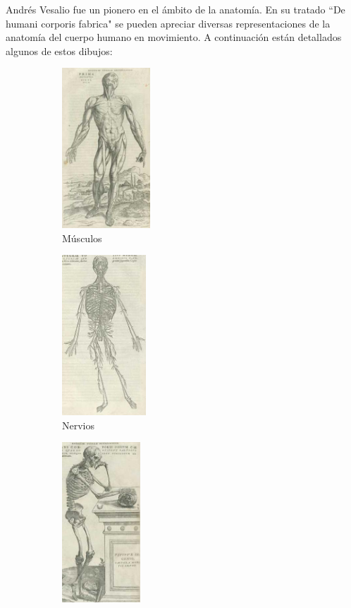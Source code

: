 Andrés Vesalio fue un pionero en el ámbito de la anatomía. En su tratado ``De humani corporis fabrica" se pueden apreciar diversas representaciones de la anatomía del cuerpo humano en movimiento. A continuación están detallados algunos de estos dibujos:
\begin{figure}[H]
    \centering
        \begin{subfigure}[b]{0.28\textwidth}
             \includegraphics[height=6cm]{musculos.jpg}
             \caption{Músculos}
        \end{subfigure}
        \begin{subfigure}[b]{0.28\textwidth}
             \includegraphics[height=6cm]{nervios.jpg}
             \caption{Nervios}
        \end{subfigure}
        \begin{subfigure}[b]{0.28\textwidth}
            \includegraphics[height=6cm]{esqueleto.jpg}

\end{subfigure}
\end{figure}

